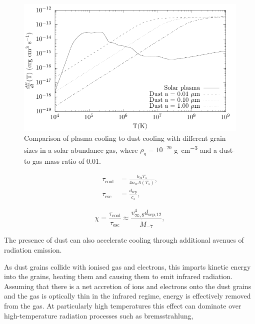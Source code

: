 \begin{figure}
  \centering
  \includegraphics{assets/dust-plasma-cooling-comparison/cooling-comparison.pdf}
  \caption[Dust cooling vs. plasma cooling]{Comparison of plasma cooling to dust cooling with different grain sizes in a solar abundance gas, where $\rho_g = 10^{-20}$ \si{\gram\per\centi\metre\cubed} and a dust-to-gas mass ratio of 0.01.}
  \label{fig:dustplasmacomparison}
\end{figure}



\begin{subequations}
  \begin{align}
    \tau_\text{cool} & = \frac{k_B T_s}{4n_w \Lambda(T_s)} \label{eq:taucool} ,\\ 
    \tau_\text{esc}  & = \frac{d_\text{sep}}{c_s} \label{eq:tauesc} ,
  \end{align}
\end{subequations}

\begin{equation}
  \chi = \frac{\tau_\text{cool}}{\tau_\text{esc}} \approx \frac{v^4_{\infty,8} d_\text{sep,12}}{\dot M_{-7}} \label{eq:coolingparameter} ,
\end{equation}



The presence of dust can also accelerate cooling through additional avenues of radiation emission.

As dust grains collide with ionised gas and electrons, this imparts kinetic energy into the grains, heating them and causing them to emit infrared radiation. Assuming that there is a net accretion of ions and electrons onto the dust grains and the gas is optically thin in the infrared regime, energy is effectively removed from the gas.
At particularly high temperatures this effect can dominate over high-temperature radiation processes such as bremsstrahlung, 


